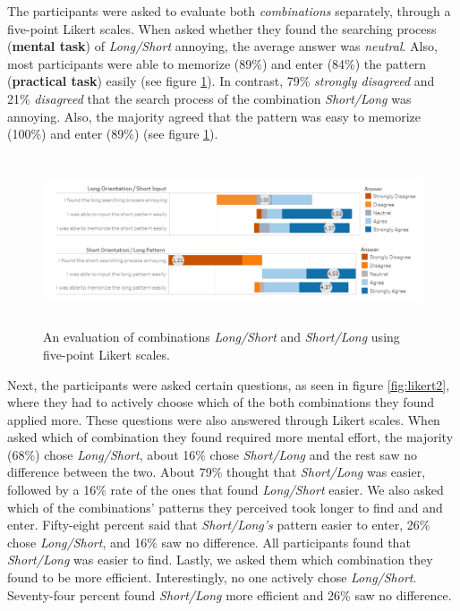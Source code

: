 The participants were asked to evaluate both \textit{combinations} separately, through a five-point Likert scales. When asked whether they found the searching process (\textbf{mental task}) of \textit{Long/Short} annoying, the average answer was \textit{neutral}. Also, most participants were able to memorize (89\%) and enter (84\%) the pattern (\textbf{practical task}) easily (see figure \ref{fig:likert}). In contrast, 79\% \textit{strongly disagreed} and 21\% \textit{disagreed} that the search process of the combination \textit{Short/Long} was annoying. Also, the majority agreed that the pattern was easy to memorize (100\%) and enter (89\%) (see figure \ref{fig:likert}).
 
 \begin{figure}[t!]
\centering
\includegraphics[width=15cm, height=5cm]{Chapters/graphics/Likert1213.PNG}
\caption{An evaluation of combinations \textit{Long/Short} and \textit{Short/Long} using five-point Likert scales. }
\label{fig:likert}
\end{figure}

Next, the participants were asked certain questions, as seen in figure \ref{fig:likert2}, where they had to actively choose which of the both combinations they found applied more. These questions were also answered through Likert scales. When asked which of combination they found required more mental effort, the majority (68\%) chose \textit{Long/Short}, about 16\% chose \textit{Short/Long} and the rest saw no difference between the two. 
About 79\% thought that \textit{Short/Long} was easier, followed by a 16\% rate of the ones that found \textit{Long/Short} easier. We also asked which of the combinations' patterns they perceived took longer to find and and enter. Fifty-eight percent said that \textit{Short/Long's} pattern easier to enter, 26\% chose \textit{Long/Short}, and 16\% saw no difference. All participants found that \textit{Short/Long} was easier to find. Lastly, we asked them which combination they found to be more efficient. Interestingly, no one actively chose \textit{Long/Short}. Seventy-four percent found \textit{Short/Long} more efficient and 26\% saw no difference. \\

